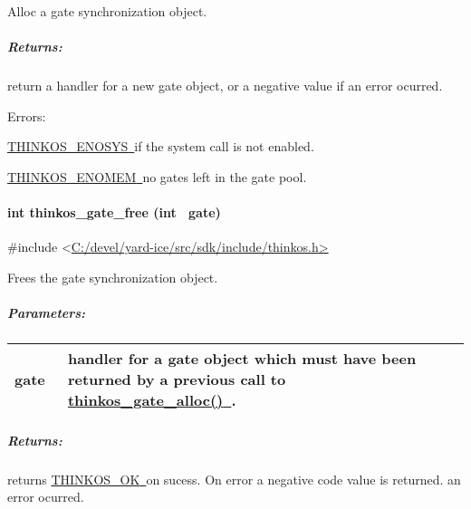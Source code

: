 {{Alloc a gate synchronization object. }

{}

\subparagraph{\texorpdfstring{{Returns:}}{Returns:}}\label{returns-43}

{return a handler for a new gate object, or a negative value if an error
ocurred.}

{Errors:}

{\protect\hyperlink{h.3s49zyc}{THINKOS\_ENOSYS}}{\protect\hyperlink{h.3s49zyc}{~}}{if
the system call is not enabled.}

{\protect\hyperlink{h.meukdy}{THINKOS\_ENOMEM}}{\protect\hyperlink{h.meukdy}{~}}{no
gates left in the gate pool. }

\paragraph{\texorpdfstring{{int thinkos\_gate\_free (int
~gate)}}{int thinkos\_gate\_free (int ~gate)}}\label{int-thinkos_gate_free-int-gate}

{}

{\#include
\textless{}}{\protect\hyperlink{h.pkwqa1}{C:/devel/yard-ice/src/sdk/include/thinkos.h}}{\protect\hyperlink{h.pkwqa1}{\textgreater{}}}

{Frees the gate synchronization object. }

{}

\subparagraph{\texorpdfstring{{Parameters:}}{Parameters:}}\label{parameters-41}

\protect\hypertarget{t.732390f47e0bc9de7bbae841837625969c4e7db0}{}{}\protect\hypertarget{t.41}{}{}

\begin{longtable}[]{@{}ll@{}}
\toprule
\begin{minipage}[t]{0.47\columnwidth}\raggedright\strut
{gate}{~}\strut
\end{minipage} & \begin{minipage}[t]{0.47\columnwidth}\raggedright\strut
{handler for a gate object which must have been returned by a previous
call to
}{\protect\hyperlink{h.1egqt2p}{thinkos\_gate\_alloc()}}{\protect\hyperlink{h.1egqt2p}{~}}{.
}\strut
\end{minipage}\tabularnewline
\bottomrule
\end{longtable}

\subparagraph{\texorpdfstring{{Returns:}}{Returns:}}\label{returns-44}

{returns
}{\protect\hyperlink{h.2fk6b3p}{THINKOS\_OK}}{\protect\hyperlink{h.2fk6b3p}{~}}{on
sucess. On error a negative code value is returned. an error ocurred.}

}

